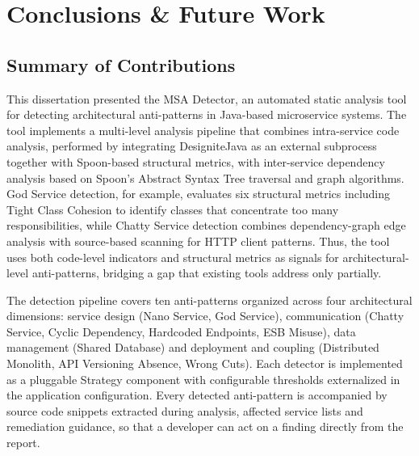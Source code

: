 \chapter{Conclusions \& Future Work}
\label{conclusions}

\section{Summary of Contributions}
\label{sec:summary-contributions}

\par This dissertation presented the MSA Detector, an automated static analysis tool for detecting architectural anti-patterns in Java-based microservice systems. The tool implements a multi-level analysis pipeline that combines intra-service code analysis, performed by integrating DesigniteJava as an external subprocess together with Spoon-based structural metrics, with inter-service dependency analysis based on Spoon's Abstract Syntax Tree traversal and graph algorithms. God Service detection, for example, evaluates six structural metrics including Tight Class Cohesion to identify classes that concentrate too many responsibilities, while Chatty Service detection combines dependency-graph edge analysis with source-based scanning for HTTP client patterns. Thus, the tool uses both code-level indicators and structural metrics as signals for architectural-level anti-patterns, bridging a gap that existing tools address only partially.

\par The detection pipeline covers ten anti-patterns organized across four architectural dimensions: service design (Nano Service, God Service), communication (Chatty Service, Cyclic Dependency, Hardcoded Endpoints, ESB Misuse), data management (Shared Database) and deployment and coupling (Distributed Monolith, API Versioning Absence, Wrong Cuts). Each detector is implemented as a pluggable Strategy component with configurable thresholds externalized in the application configuration. Every detected anti-pattern is accompanied by source code snippets extracted during analysis, affected service lists and remediation guidance, so that a developer can act on a finding directly from the report.

